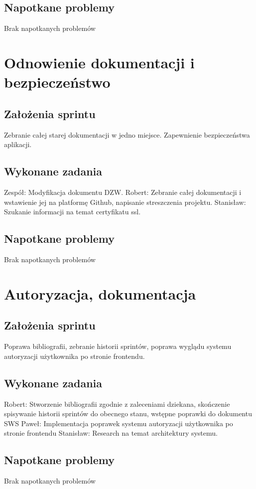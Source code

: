 \documentclass[a4paper,11pt]{report}
\begin{document}
\subsection {Napotkane problemy}
Brak napotkanych problemów

\section {Odnowienie dokumentacji i bezpieczeństwo}
\subsection {Założenia sprintu}
Zebranie całej starej dokumentacji w jedno miejsce. Zapewnienie bezpieczeństwa aplikacji.  
\subsection {Wykonane zadania}
Zespół: Modyfikacja dokumentu DZW.
Robert: Zebranie całej dokumentacji i wstawienie jej na platformę Github, napisanie streszczenia projektu.
Stanisław: Szukanie informacji na temat certyfikatu ssl.
\subsection {Napotkane problemy}
Brak napotkanych problemów

\section {Autoryzacja, dokumentacja}
\subsection {Założenia sprintu}
Poprawa bibliografii, zebranie historii sprintów, poprawa wyglądu systemu autoryzacji użytkownika po stronie frontendu.
\subsection {Wykonane zadania}
Robert: Stworzenie bibliografii zgodnie z zaleceniami dziekana, skończenie spisywanie historii sprintów do obecnego stanu, wstępne poprawki do dokumentu SWS
Paweł: Implementacja poprawek systemu autoryzacji użytkownika po stronie frontendu
Stanisław: Research na temat architektury systemu.
\subsection {Napotkane problemy}
Brak napotkanych problemów
\end{document}
